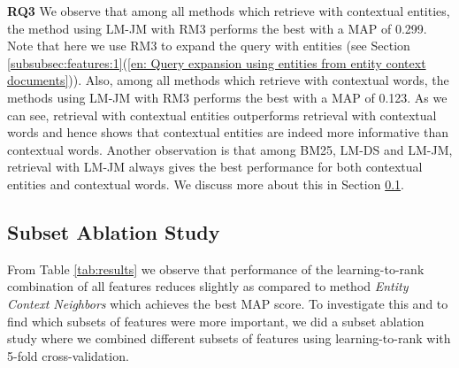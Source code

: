 \documentclass[sigconf]{acmart}
\begin{document}
\textbf{RQ3} We observe that among all methods which retrieve with contextual entities, the method using LM-JM with RM3 performs the best with a MAP of 0.299. Note that here we use RM3 to expand the query with entities (see Section \ref{subsubsec:features:1}(\ref{en: Query expansion using entities from entity context documents})). Also, among all methods which retrieve with contextual words, the methods using LM-JM with RM3 performs the best with a MAP of 0.123.  As we can see, retrieval with contextual entities outperforms retrieval with contextual words and hence shows that contextual entities are indeed more informative than contextual words. Another observation is that among BM25, LM-DS and LM-JM, retrieval with LM-JM always gives the best performance for both contextual entities and contextual words. We discuss more about this in Section \ref{subsec: ablation_study}.

\subsection{Subset Ablation Study}
\label{subsec: ablation_study}
From Table \ref{tab:results} we observe that performance of the learning-to-rank combination of all features reduces slightly as compared to method \textit{Entity Context Neighbors} which achieves the best MAP score. To investigate this and to find which subsets of features were more important, we did a subset ablation study where we combined different subsets of features using learning-to-rank with 5-fold cross-validation. 
\end{document}
